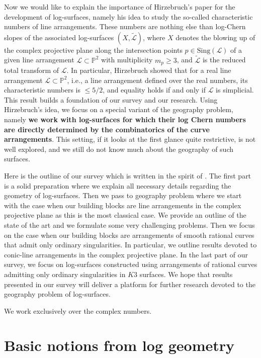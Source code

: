 \documentclass{article}
\theoremstyle{plain}
\theoremstyle{definition}
\numberwithin{equation}{section}
\begin{document}
Now we would like to explain the importance of Hirzebruch's paper \cite{Hirzebruch} for the development of log-surfaces, namely his idea to study the so-called characteristic numbers of line arrangements. These numbers are nothing else than log-Chern slopes of the associated log-surfaces $(X, \widetilde{\mathcal{L}})$, where $X$ denotes the blowing up of the complex projective plane along the intersection points $p \in \textrm{Sing}(\mathcal{L})$ of a given line arrangement $\mathcal{L} \subset \mathbb{P}^{2}$ with multiplicity $m_{p}\geq 3$, and $\widetilde{\mathcal{L}}$ is the reduced total transform of $\mathcal{L}$. In particular, Hirzebruch showed that for a real line arrangement $\mathcal{L} \subset \mathbb{P}^{2}$, i.e., a line arrangement defined over the real numbers, its characteristic numbers is $\leq 5/2$, and equality holds if and only if $\mathcal{L}$ is simplicial. This result builds a foundation of our survey and our research. Using Hirzebruch's idea, we focus on a special variant of the geography problem, namely \textbf{we work with log-surfaces for which their log Chern numbers are directly determined by the combinatorics of the curve arrangements}. This setting, if it looks at the first glance quite restrictive, is not well explored, and we still do not know much about the geography of such surfaces. 

Here is the outline of our survey which is written in the spirit of \cite{ML}. The first part is a solid preparation where we explain all necessary details regarding the geometry of log-surfaces. Then we pass to geography problem where we start with the case when our building blocks are line arrangements in the complex projective plane as this is the most classical case. We provide an outline of the state of the art and we formulate some very challenging problems. Then we focus on the case when our building blocks are arrangements of smooth rational curves that admit only ordinary singularities. In particular, we outline results devoted to conic-line arrangements in the complex projective plane. In the last part of our survey, we focus on log-surfaces constructed using arrangements of rational curves admitting only ordinary singularities in $K3$ surfaces. We hope that results presented in our survey will deliver a platform for further research devoted to the geography problem of log-surfaces.

We work exclusively over the complex numbers.
\section{Basic notions from log geometry}
\end{document}
